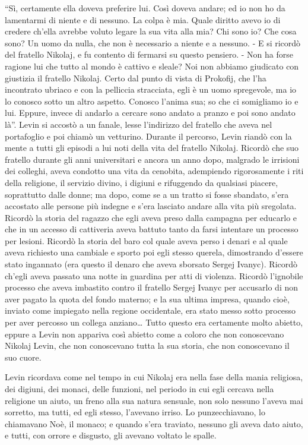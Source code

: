 ``Sì, certamente ella doveva preferire lui. Così doveva andare; ed io non ho da lamentarmi di niente e di nessuno. La colpa è mia. Quale diritto avevo io di credere ch'ella avrebbe voluto legare la sua vita alla mia? Chi sono io? Che cosa sono? Un uomo da nulla, che non è necessario a niente e a nessuno. - E si ricordò del fratello Nikolaj, e fu contento di fermarsi su questo pensiero. - Non ha forse ragione lui che tutto al mondo è cattivo e sleale? Noi non abbiamo giudicato con giustizia il fratello Nikolaj. Certo dal punto di vista di Prokofij, che l'ha incontrato ubriaco e con la pelliccia stracciata, egli è un uomo spregevole, ma io lo conosco sotto un altro aspetto. Conosco l'anima sua; so che ci somigliamo io e lui. Eppure, invece di andarlo a cercare sono andato a pranzo e poi sono andato là''. Levin si accostò a un fanale, lesse l'indirizzo del fratello che aveva nel portafoglio e poi chiamò un vetturino. Durante il percorso, Levin riandò con la mente a tutti gli episodi a lui noti della vita del fratello Nikolaj. Ricordò che suo fratello durante gli anni universitari e ancora un anno dopo, malgrado le irrisioni dei colleghi, aveva condotto una vita da cenobita, adempiendo rigorosamente i riti della religione, il servizio divino, i digiuni e rifuggendo da qualsiasi piacere, soprattutto dalle donne; ma dopo, come se a un tratto si fosse sbandato, s'era accostato alle persone più indegne e s'era lasciato andare alla vita più sregolata. Ricordò la storia del ragazzo che egli aveva preso dalla campagna per educarlo e che in un accesso di cattiveria aveva battuto tanto da farsi intentare un processo per lesioni. Ricordò la storia del baro col quale aveva perso i denari e al quale aveva richiesto una cambiale e sporto poi egli stesso querela, dimostrando d'essere stato ingannato (era questo il denaro che aveva sborsato Sergej Ivanyc). Ricordò ch'egli aveva passato una notte in guardina per atti di violenza. Ricordò l'ignobile processo che aveva imbastito contro il fratello Sergej Ivanyc per accusarlo di non aver pagato la quota del fondo materno; e la sua ultima impresa, quando cioè, inviato come impiegato nella regione occidentale, era stato messo sotto processo per aver percosso un collega anziano\ldots{} Tutto questo era certamente molto abietto, eppure a Levin non appariva così abietto come a coloro che non conoscevano Nikolaj Levin, che non conoscevano tutta la sua storia, che non conoscevano il suo cuore. 

Levin ricordava come nel tempo in cui Nikolaj era nella fase della mania religiosa, dei digiuni, dei monaci, delle funzioni, nel periodo in cui egli cercava nella religione un aiuto, un freno alla sua natura sensuale, non solo nessuno l'aveva mai sorretto, ma tutti, ed egli stesso, l'avevano irriso. Lo punzecchiavano, lo chiamavano Noè, il monaco; e quando s'era traviato, nessuno gli aveva dato aiuto, e tutti, con orrore e disgusto, gli avevano voltato le spalle. 

